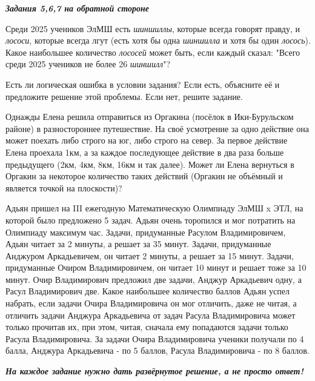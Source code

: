 \centerline{\textbf{\textit{Задания 5,6,7 на обратной стороне}}}

\newpage
\hspace{3mm}

 Среди 2025 учеников ЭлМШ есть \textit{шиншиллы}, которые всегда говорят правду, и \textit{лососи}, которые всегда лгут (есть хотя бы одна \textit{шиншилла} и хотя бы один \textit{лосось}). Какое наибольшее количество \textit{лососей} может быть, если каждый сказал: "Всего среди 2025 учеников не более 26 \textit{шиншилл}"?

Есть ли логическая ошибка в условии задания? Если есть, объясните её и предложите решение этой проблемы. Если нет, решите задание.

\hspace{3mm}

 Однажды Елена решила отправиться из Оргакина (посёлок в Ики-Бурульском районе) в разностороннее путешествие. На своё усмотрение за одно действие она может поехать либо строго на юг, либо строго на север. За первое действие Елена проехала 1км, а за каждое последующее действие в два раза больше предыдущего (2км, 4км, 8км, 16км и так далее). Может ли Елена вернуться в Оргакин за некоторое количество таких действий (Оргакин не объёмный и является точкой на плоскости)?

\hspace{3mm}

 Адьян пришел на III ежегодную Математическую Олимпиаду ЭлМШ x ЭТЛ, на которой было предложено 5 задач. Адьян очень торопился и мог потратить на Олимпиаду максимум час. Задачи, придуманные Расулом Владимировичем, Адьян читает за 2 минуты, а решает за 35 минут. Задачи, придуманные Анджуром Аркадьевичем, он читает 2 минуты, а решает за 15 минут. Задачи, придуманные Очиром Владимировичем, он читает 10 минут и решает тоже за 10 минут. Очир Владимирович предложил две задачи, Анджур Аркадьевич одну, а Расул Владимирович две. Какое наибольшее количество баллов Адьян успел набрать, если задачи Очира Владимировича он мог отличить, даже не читая, а отличить задачи Анджура Аркадьевича от задач Расула Владимировича может только прочитав их, при этом, читая, сначала ему попадаются задачи только Расула Владимировича. За задачи Очира Владимировича ученики получали по 4 балла, Анджура Аркадьевича - по 5 баллов, Расула Владимировича - по 8 баллов.

\hspace{3mm}

\centerline{\textbf{\textit{На каждое задание нужно дать развёрнутое решение, а не просто ответ!}}}